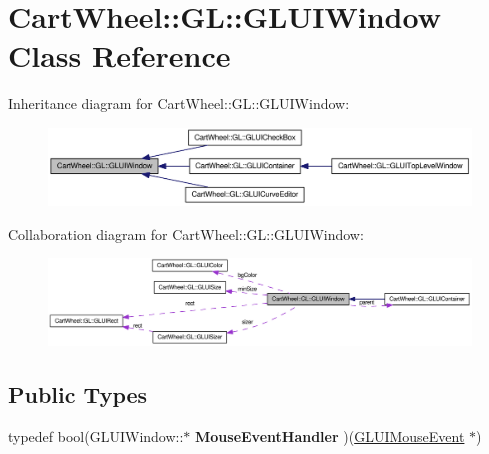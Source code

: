 \hypertarget{classCartWheel_1_1GL_1_1GLUIWindow}{
\section{CartWheel::GL::GLUIWindow Class Reference}
\label{classCartWheel_1_1GL_1_1GLUIWindow}
}


Inheritance diagram for CartWheel::GL::GLUIWindow:\nopagebreak
\begin{figure}[H]
\begin{center}
\leavevmode
\includegraphics[width=400pt]{classCartWheel_1_1GL_1_1GLUIWindow__inherit__graph}
\end{center}
\end{figure}


Collaboration diagram for CartWheel::GL::GLUIWindow:\nopagebreak
\begin{figure}[H]
\begin{center}
\leavevmode
\includegraphics[width=400pt]{classCartWheel_1_1GL_1_1GLUIWindow__coll__graph}
\end{center}
\end{figure}
\subsection*{Public Types}
\begin{DoxyCompactItemize}
\item 
\hypertarget{classCartWheel_1_1GL_1_1GLUIWindow_a896cd9dd622962b8ac8af99ec89d9ea9}{
typedef bool(GLUIWindow::$\ast$ {\bfseries MouseEventHandler} )(\hyperlink{classCartWheel_1_1GL_1_1GLUIMouseEvent}{GLUIMouseEvent} $\ast$)}
\label{classCartWheel_1_1GL_1_1GLUIWindow_a896cd9dd622962b8ac8af99ec89d9ea9}

\end{DoxyCompactItemize}
